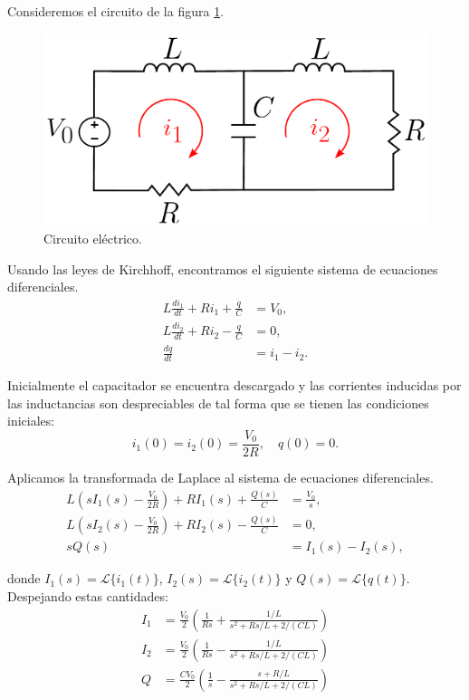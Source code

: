 \begin{ejemplo}
    Consideremos el circuito de la figura \ref{fig:Circuit}. 
    
    \begin{figure}[H]
        \centering
        \includegraphics[scale = 0.65]{Figuras/Circuito.pdf}
        \caption{Circuito eléctrico.}
        \label{fig:Circuit}
    \end{figure}
    
    Usando las leyes de Kirchhoff, encontramos el siguiente sistema de ecuaciones diferenciales.
    \begin{align*}
        L \frac{di_1}{dt} + Ri_1 + \frac{q}{C} &= V_0, \\
        L \frac{di_2}{dt} + Ri_2 - \frac{q}{C} &= 0, \\
        \frac{dq}{dt} &= i_1 - i_2.
    \end{align*}
    
    Inicialmente el capacitador se encuentra descargado y las corrientes inducidas por las inductancias son despreciables de tal forma que se tienen las condiciones iniciales:
    $$i_1(0) = i_2(0) = \frac{V_0}{2R}, \quad q(0) = 0.$$

    Aplicamos la transformada de Laplace al sistema de ecuaciones diferenciales.
    \begin{align*}
        L\left( sI_1(s) - \frac{V_0}{2R} \right) + RI_1(s) + \frac{Q(s)}{C} &= \frac{V_0}{s}, \\
       L\left( sI_2(s) - \frac{V_0}{2R} \right) + RI_2(s) - \frac{Q(s)}{C}  &= 0, \\
        sQ(s) &= I_1(s) - I_2(s),
    \end{align*}

    donde $I_1(s) = \mathcal{L}\{i_1(t)\}$, $I_2(s) = \mathcal{L}\{i_2(t)\}$ y $Q(s) = \mathcal{L}\{q(t)\}$. Despejando estas cantidades:
    \begin{align*}
        I_1 &= \frac{V_0}{2} \left(\frac{1}{Rs} + \frac{1/L}{s^2 + R s/L + 2/(CL)} \right) \\
        I_2 &= \frac{V_0}{2} \left(\frac{1}{Rs} - \frac{1/L}{s^2 + R s/L + 2/(CL)} \right) \\
            Q &= \frac{C V_0}{2} \left( \frac{1}{s} - \frac{s+R/L}{s^2 + Rs/L + 2/(CL)} \right)
    \end{align*}


\end{ejemplo}

